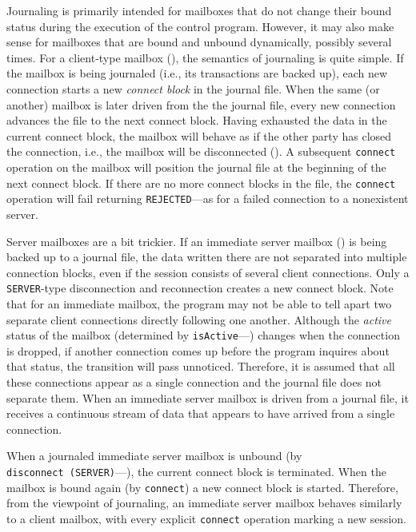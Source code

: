 Journaling is primarily intended for mailboxes that do not change their
bound status during the execution of the control program.
However, it may also make sense for mailboxes that are bound and unbound
dynamically, possibly several times.
For a client-type mailbox (), the semantics of journaling
is quite simple.
If the mailbox is being journaled (i.e., its transactions are backed up),
each new connection starts a new {\em connect block\/} in the journal file.
When the same (or another) mailbox is later driven from the the journal
file, every new connection advances the file to the next connect block.
Having exhausted the data in the current connect block, the mailbox will
behave as if the other party has closed the connection, i.e., the
mailbox will be disconnected ().
A subsequent {\tt connect} operation on the mailbox will position
the journal file at the beginning of the next connect block.
If there are no more connect blocks in the file, the {\tt connect}
operation will fail returning {\tt REJECTED}---as for a failed connection
to a nonexistent server.

Server mailboxes are a bit trickier.
If an immediate server mailbox () is being backed up
to a journal file, the data written there are not separated into
multiple connection blocks, even if the session consists of several
client connections.
Only a {\tt SERVER}-type disconnection and reconnection creates a new
connect block.
Note that for an immediate mailbox, the program may not be able to tell apart
two separate client connections directly following one another.
Although the {\em active\/} status of the mailbox
(determined by {\tt isActive}---) changes when the
connection is dropped, if another connection comes up before the program
inquires about that status, the transition will pass unnoticed.
Therefore, it is assumed that all these connections appear as a single
connection and the journal file does not separate them.
When an immediate server mailbox is driven from a journal file, it receives
a continuous stream of data that appears to have arrived from a single
connection.

When a journaled immediate server mailbox is unbound
(by {\tt disconnect~(SERVER)}---),
the current connect block is terminated.
When the mailbox is bound again (by {\tt connect}) a new connect block
is started.
Therefore, from the viewpoint of journaling,
an immediate server mailbox behaves similarly to a client mailbox, with
every explicit {\tt connect} operation marking a new session.

